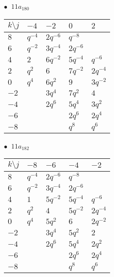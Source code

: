 \begin{minipage}{\linewidth}
$\bullet\ $ $11a_{180}$ \vspace{0.5em} \\
\begin{tabular}{l|llll}
$k \setminus j$ & $-4$ & $-2$ & $0$ & $2$ \\
\hline
$8$ & $q^{-4}$ & $2q^{-6}$ & $q^{-8}$ &  \\
$6$ & $q^{-2}$ & $3q^{-4}$ & $2q^{-6}$ &  \\
$4$ & $2$ & $6q^{-2}$ & $5q^{-4}$ & $q^{-6}$ \\
$2$ & $q^{2}$ & $6$ & $7q^{-2}$ & $2q^{-4}$ \\
$0$ & $q^{4}$ & $6q^{2}$ & $9$ & $3q^{-2}$ \\
$-2$ &  & $3q^{4}$ & $7q^{2}$ & $4$ \\
$-4$ &  & $2q^{6}$ & $5q^{4}$ & $3q^{2}$ \\
$-6$ &  &  & $2q^{6}$ & $2q^{4}$ \\
$-8$ &  &  & $q^{8}$ & $q^{6}$ \\
\end{tabular}
\vspace{2em}
\end{minipage}
%
\begin{minipage}{\linewidth}
$\bullet\ $ $11a_{182}$ \vspace{0.5em} \\
\begin{tabular}{l|llll}
$k \setminus j$ & $-8$ & $-6$ & $-4$ & $-2$ \\
\hline
$8$ & $q^{-4}$ & $2q^{-6}$ & $q^{-8}$ &  \\
$6$ & $q^{-2}$ & $3q^{-4}$ & $2q^{-6}$ &  \\
$4$ & $1$ & $5q^{-2}$ & $5q^{-4}$ & $q^{-6}$ \\
$2$ & $q^{2}$ & $4$ & $5q^{-2}$ & $2q^{-4}$ \\
$0$ & $q^{4}$ & $5q^{2}$ & $6$ & $2q^{-2}$ \\
$-2$ &  & $3q^{4}$ & $5q^{2}$ & $2$ \\
$-4$ &  & $2q^{6}$ & $5q^{4}$ & $2q^{2}$ \\
$-6$ &  &  & $2q^{6}$ & $2q^{4}$ \\
$-8$ &  &  & $q^{8}$ & $q^{6}$ \\
\end{tabular}
\vspace{2em}
\end{minipage}
%

